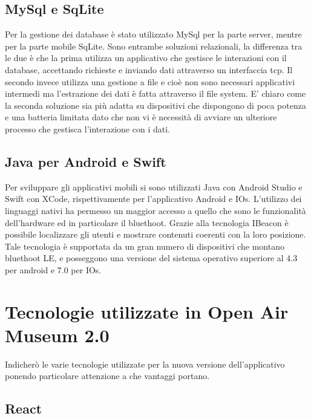 	\subsection{MySql e SqLite}\vspace{5mm}
	
	Per la gestione dei database è stato utilizzato MySql per la parte server, mentre per la parte mobile SqLite. Sono entrambe soluzioni relazionali, la differenza tra le due è che la prima utilizza un applicativo che gestisce le interazioni con il database, accettando richieste e inviando dati attraverso un interfaccia tcp. Il secondo invece utilizza una gestione a file e cioè non sono necessari applicativi intermedi ma l'estrazione dei dati è fatta attraverso il file system. E' chiaro come la seconda soluzione sia più adatta su dispositivi che dispongono di poca potenza e una batteria limitata dato che non vi è necessità di avviare un ulteriore processo che gestisca l'interazione con i dati.
	
	\subsection{Java per Android e Swift}\vspace{5mm}
	
	Per sviluppare gli applicativi mobili si sono utilizzati Java con Android Studio e Swift con XCode, rispettivamente per l'applicativo Android e IOs. L'utilizzo dei linguaggi nativi ha permesso un maggior accesso a quello che sono le funzionalità dell'hardware ed in particolare il bluethoot. Grazie alla tecnologia IBeacon è possibile localizzare gli utenti e mostrare contenuti coerenti con la loro posizione. Tale tecnologia è supportata da un gran numero di dispositivi che montano bluethoot LE, e posseggono una versione del sistema operativo superiore al 4.3 per android e 7.0 per IOs.
	
\section{Tecnologie utilizzate in Open Air Museum 2.0}\vspace{5mm}
Indicherò le varie tecnologie utilizzate per la nuova versione dell'applicativo ponendo particolare attenzione a che vantaggi portano.\vspace{5mm}

	\subsection{React}\vspace{5mm}

